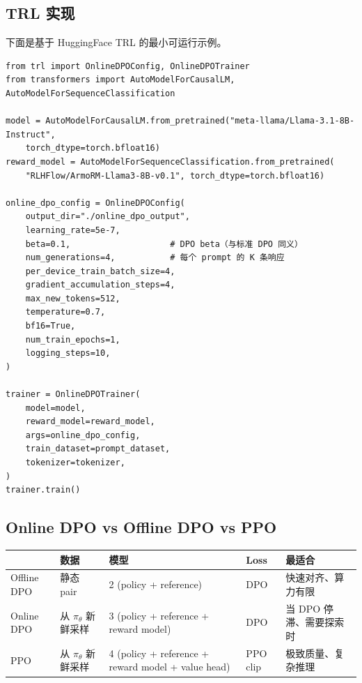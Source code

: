 \subsection{TRL 实现}
\label{trl-implementation-dup4}

下面是基于 HuggingFace TRL 的最小可运行示例。

\begin{lstlisting}[style=pythonstyle]
from trl import OnlineDPOConfig, OnlineDPOTrainer
from transformers import AutoModelForCausalLM, AutoModelForSequenceClassification

model = AutoModelForCausalLM.from_pretrained("meta-llama/Llama-3.1-8B-Instruct",
    torch_dtype=torch.bfloat16)
reward_model = AutoModelForSequenceClassification.from_pretrained(
    "RLHFlow/ArmoRM-Llama3-8B-v0.1", torch_dtype=torch.bfloat16)

online_dpo_config = OnlineDPOConfig(
    output_dir="./online_dpo_output",
    learning_rate=5e-7,
    beta=0.1,                    # DPO beta（与标准 DPO 同义）
    num_generations=4,           # 每个 prompt 的 K 条响应
    per_device_train_batch_size=4,
    gradient_accumulation_steps=4,
    max_new_tokens=512,
    temperature=0.7,
    bf16=True,
    num_train_epochs=1,
    logging_steps=10,
)

trainer = OnlineDPOTrainer(
    model=model,
    reward_model=reward_model,
    args=online_dpo_config,
    train_dataset=prompt_dataset,
    tokenizer=tokenizer,
)
trainer.train()
\end{lstlisting}

\subsection{Online DPO vs Offline DPO vs PPO}
\label{online-dpo-vs-offline-dpo-vs-ppo}

\noindent\begin{tabularx}{\linewidth}{@{}l l Z{1.36} l Z{0.64}@{}}
\toprule
 & \textbf{数据} & \textbf{模型} & \textbf{Loss} & \textbf{最适合} \\
\midrule
Offline DPO & 静态 pair & 2 (policy + reference) & DPO & 快速对齐、算力有限 \\
Online DPO & 从 $\pi_\theta$ 新鲜采样 & 3 (policy + reference + reward model) & DPO & 当 DPO 停滞、需要探索时 \\
PPO & 从 $\pi_\theta$ 新鲜采样 & 4 (policy + reference + reward model + value head) & PPO clip & 极致质量、复杂推理 \\
\bottomrule
\end{tabularx}

